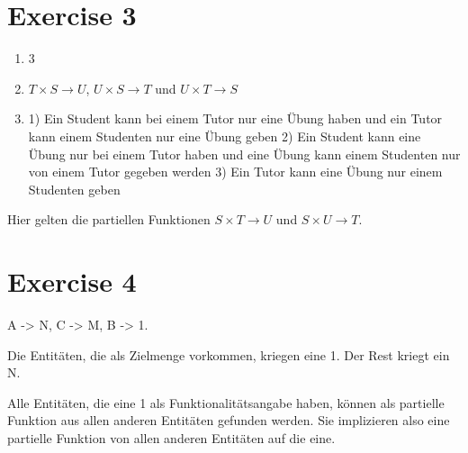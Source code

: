 \documentclass[10pt,a4paper]{article}
\begin{document}
\section*{Exercise 3}

\begin{enumerate}
\item 3
\item $T \times S \rightarrow U$, $U \times S \rightarrow T$ und $U \times T \rightarrow S$
\item
  1) Ein Student kann bei einem Tutor nur eine Übung haben und ein Tutor kann einem Studenten nur eine Übung geben
  2) Ein Student kann eine Übung nur bei einem Tutor haben und eine Übung kann einem Studenten nur von einem Tutor gegeben werden
  3) Ein Tutor kann eine Übung nur einem Studenten geben
\end{enumerate}

Hier gelten die partiellen Funktionen $S \times T \rightarrow U$ und $S \times U \rightarrow T$.

\section*{Exercise 4}

A -> N, C -> M, B -> 1.

Die Entitäten, die als Zielmenge vorkommen, kriegen eine 1.
Der Rest kriegt ein N.

Alle Entitäten, die eine 1 als Funktionalitätsangabe haben, können als partielle Funktion aus allen anderen Entitäten gefunden werden.
Sie implizieren also eine partielle Funktion von allen anderen Entitäten auf die eine.
\end{document}
